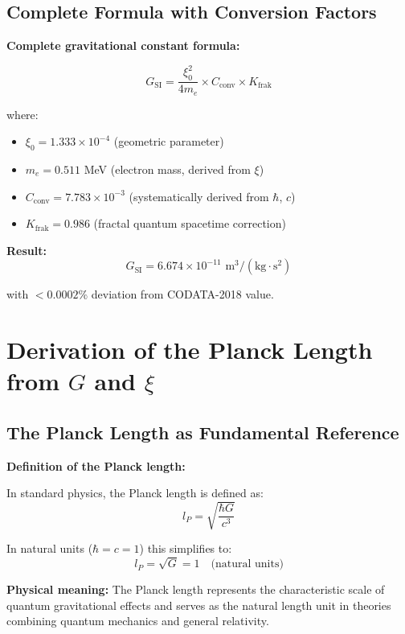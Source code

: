 \documentclass[12pt,a4paper]{article}
\begin{document}
	\subsection{Complete Formula with Conversion Factors}
	
	\begin{keyresult}
		\textbf{Complete gravitational constant formula:}
		
		\begin{equation}
			\boxed{G_{\text{SI}} = \frac{\xi_0^2}{4 m_e} \times C_{\text{conv}} \times K_{\text{frak}}}
			\label{eq:G_complete}
		\end{equation}
		
		where:
		\begin{itemize}
			\item $\xi_0 = 1.333 \times 10^{-4}$ (geometric parameter)
			\item $m_e = 0.511$ MeV (electron mass, derived from $\xi$)
			\item $C_{\text{conv}} = 7.783 \times 10^{-3}$ (systematically derived from $\hbar$, $c$)
			\item $K_{\text{frak}} = 0.986$ (fractal quantum spacetime correction)
		\end{itemize}
		
		\textbf{Result:}
		\begin{equation}
			G_{\text{SI}} = 6.674 \times 10^{-11} \text{ m}^3/(\text{kg}\cdot\text{s}^2)
		\end{equation}
		
		with $<0.0002\%$ deviation from CODATA-2018 value.
	\end{keyresult}
	
	\section{Derivation of the Planck Length from $G$ and $\xi$}
	
	\subsection{The Planck Length as Fundamental Reference}
	
	\begin{derivation}
		\textbf{Definition of the Planck length:}
		
		In standard physics, the Planck length is defined as:
		\begin{equation}
			l_P = \sqrt{\frac{\hbar G}{c^3}}
			\label{eq:planck_length_standard}
		\end{equation}
		
		In natural units ($\hbar = c = 1$) this simplifies to:
		\begin{equation}
			\boxed{l_P = \sqrt{G} = 1 \quad \text{(natural units)}}
			\label{eq:planck_natural}
		\end{equation}
		
		\textbf{Physical meaning:} The Planck length represents the characteristic scale of quantum gravitational effects and serves as the natural length unit in theories combining quantum mechanics and general relativity.
	\end{derivation}
	
\end{document}
